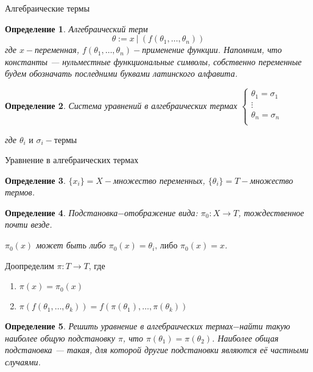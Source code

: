 \documentclass[aspectratio=169]{beamer}
\newtheorem{dfn}{Определение}[section]
\begin{document}
\begin{frame}{Алгебраические термы}
	\begin{dfn}Алгебраический терм $$\theta := x\:|\:(f(\theta_1,\ldots,\theta_n))$$ 
где $x-$переменная, $f(\theta_1,\ldots,\theta_n)-$применение функции. Напомним, что константы --- нульместные
функциональные символы, собственно переменные будем обозначать последними буквами латинского алфавита. \end{dfn}
	\begin{dfn}Система уравнений в алгебраических термах
	$
		\begin{cases}
			\theta_1=\sigma_1&\\
			\vdots&\\
			\theta_n=\sigma_n&\\
		\end{cases}
	$\par где $\theta_i \text{ и } \sigma_i-\text{термы}$\par
\end{dfn}
\end{frame}
\begin{frame}{Уравнение в алгебраических термах}
	\begin{dfn}$\{x_i\}=X-$множество переменных, $\{\theta_i\}=T-$множество термов.\end{dfn}
	\begin{dfn}Подстановка$-$отображение вида: $\pi_0:X\to T$, тождественное почти везде.
        \par $\pi_0(x)$ может быть либо $\pi_0(x)=\theta_i\text{, либо }\pi_0(x)=x$.\end{dfn} 
	Доопределим $\pi:T\to T$, где \begin{enumerate}
		\item $\pi(x)=\pi_0(x)$
		\item $\pi(f(\theta_1, \ldots, \theta_k))=f(\pi(\theta_1), \ldots, \pi(\theta_k))$
	\end{enumerate}
	
	\begin{dfn}Решить уравнение в алгебраических термах$-$найти такую наиболее общую подстановку $\pi$, 
        что $\pi(\theta_1)=\pi(\theta_2)$.
Наиболее общая подстановка --- такая, для которой другие подстановки являются её частными случаями.\end{dfn} 
\end{frame}
\end{document}
